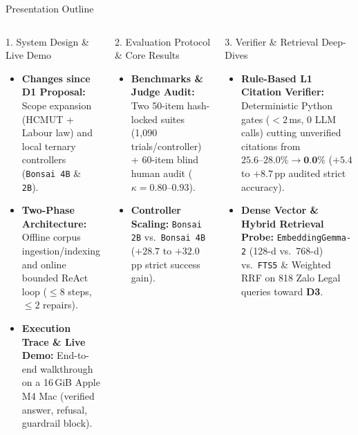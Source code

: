\documentclass[aspectratio=1610,11pt]{beamer}
\newcommand{\pp}{\,pp\xspace}
\begin{document}
\begin{frame}{Presentation Outline}
  \begin{columns}[T]
    \begin{block}{1. System Design \& Live Demo}
      \scriptsize
      \begin{itemize}\scriptsize
        \item \textbf{Changes since D1 Proposal:} Scope expansion (HCMUT + Labour law) and local ternary controllers (\texttt{Bonsai 4B} \& \texttt{2B}).
        \item \textbf{Two-Phase Architecture:} Offline corpus ingestion/indexing and online bounded ReAct loop ($\le 8$ steps, $\le 2$ repairs).
        \item \textbf{Execution Trace \& Live Demo:} End-to-end walkthrough on a 16\,GiB Apple M4 Mac (verified answer, refusal, guardrail block).
      \end{itemize}
    \end{block}
    \vspace{2pt}

    \begin{block}{2. Evaluation Protocol \& Core Results}
      \scriptsize
      \begin{itemize}\scriptsize
        \item \textbf{Benchmarks \& Judge Audit:} Two 50-item hash-locked suites (1,090 trials/controller) + 60-item blind human audit ($\kappa = 0.80\text{--}0.93$).
        \item \textbf{Controller Scaling:} \texttt{Bonsai 2B} vs.\ \texttt{Bonsai 4B} ($+28.7$ to $+32.0$\pp strict success gain).
      \end{itemize}
    \end{block}

    \begin{block}{3. Verifier \& Retrieval Deep-Dives}
      \scriptsize
      \begin{itemize}\scriptsize
        \item \textbf{Rule-Based L1 Citation Verifier:} Deterministic Python gates ($<2$\,ms, 0 LLM calls) cutting unverified citations from $25.6\text{--}28.0\% \to \textbf{0.0\%}$ ($+5.4$ to $+8.7$\pp audited strict accuracy).
        \item \textbf{Dense Vector \& Hybrid Retrieval Probe:} \texttt{EmbeddingGemma-2} (128-d vs.\ 768-d) vs.\ \texttt{FTS5} \& Weighted RRF on 818 Zalo Legal queries toward \textbf{D3}.
      \end{itemize}
    \end{block}
    \vspace{2pt}


\end{columns}
\end{frame}
\end{document}

